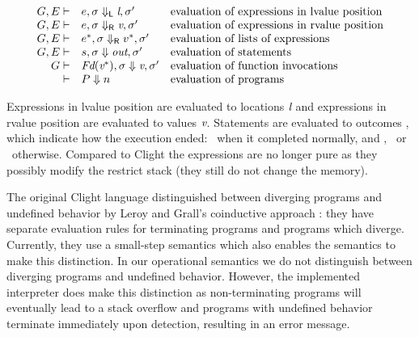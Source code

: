 \[
\begin{array}{rll}
    G,E\vdash & e, \sigma \Downarrow_\mathsf{L} \textit{l}, \sigma'                & \text{evaluation of expressions in lvalue position} \\
    G,E\vdash & e, \sigma \Downarrow_\mathsf{R} \textit{v}, \sigma'                & \text{evaluation of expressions in rvalue position} \\
    G,E\vdash & e^*, \sigma \Downarrow_\mathsf{R} v^*, \sigma'            & \text{evaluation of lists of expressions} \\
    G,E\vdash & s, \sigma \Downarrow \textit{out},\sigma'  & \text{evaluation of statements} \\
    G \vdash  & \textit{Fd}(\textit{v}^*), \sigma \Downarrow \textit{v}, \sigma'                & \text{evaluation of function invocations} \\
    \vdash    & P \Downarrow n   & \text{evaluation of programs}
\end{array}
\]


Expressions in lvalue position are evaluated to locations $\textit{l}$ and 
expressions in rvalue position are evaluated to values $\textit{v}$.
Statements are evaluated to outcomes \Outcomevar,  which indicate how the execution ended:
\onormal \ when it completed normally, and \obreak, \ocontinue \ or \oreturn \ otherwise.
Compared to Clight the expressions are no longer pure as they possibly modify the restrict stack (they still do not change the memory).


The original Clight language distinguished between diverging programs and undefined behavior by Leroy and Grall's coinductive approach \cite{leroy2009coinductive}:
they have separate evaluation rules for terminating programs and programs which diverge.
Currently, they use a small-step semantics which also enables the semantics to make this distinction.
In our operational semantics we do not distinguish between diverging programs and undefined behavior.
However, the implemented interpreter does make this distinction as non-terminating programs will eventually lead to a stack overflow
and programs with undefined behavior terminate immediately upon detection, resulting in an error message.

